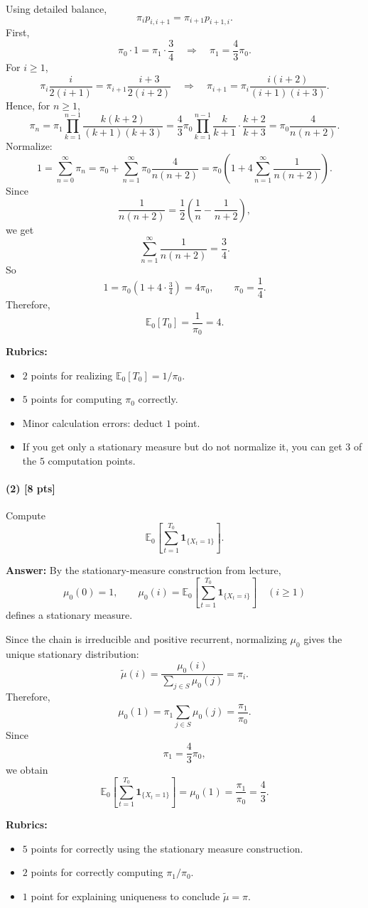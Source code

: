 \documentclass[11pt]{article}
\theoremstyle{definition}
\begin{document}
Using detailed balance,
\[
\pi_i p_{i,i+1}=\pi_{i+1}p_{i+1,i}.
\]
First,
\[
\pi_0\cdot 1=\pi_1\cdot \frac34
\quad \Rightarrow \quad
\pi_1=\frac43\pi_0.
\]
For \(i\ge 1\),
\[
\pi_i\frac{i}{2(i+1)}
=
\pi_{i+1}\frac{i+3}{2(i+2)}
\quad \Rightarrow \quad
\pi_{i+1}
=
\pi_i\frac{i(i+2)}{(i+1)(i+3)}.
\]
Hence, for \(n\ge 1\),
\[
\pi_n
=
\pi_1\prod_{k=1}^{n-1}\frac{k(k+2)}{(k+1)(k+3)}
=
\frac43\pi_0
\prod_{k=1}^{n-1}\frac{k}{k+1}\cdot\frac{k+2}{k+3}
=
\pi_0\frac{4}{n(n+2)}.
\]
Normalize:
\[
1
=
\sum_{n=0}^\infty \pi_n
=
\pi_0+\sum_{n=1}^\infty \pi_0\frac{4}{n(n+2)}
=
\pi_0\left(1+4\sum_{n=1}^\infty \frac{1}{n(n+2)}\right).
\]
Since
\[
\frac{1}{n(n+2)}=\frac12\left(\frac1n-\frac{1}{n+2}\right),
\]
we get
\[
\sum_{n=1}^\infty \frac{1}{n(n+2)}=\frac34.
\]
So
\[
1=\pi_0(1+4\cdot \tfrac34)=4\pi_0,
\qquad
\pi_0=\frac14.
\]
Therefore,
\[
\mathbb E_0[T_0]=\frac{1}{\pi_0}=4.
\]

\textbf{Rubrics:}
\begin{itemize}[leftmargin=2em]
    \item \(2\) points for realizing \(\mathbb E_0[T_0]=1/\pi_0\).
    \item \(5\) points for computing \(\pi_0\) correctly.
    \item Minor calculation errors: deduct \(1\) point.
    \item If you get only a stationary measure but do not normalize it, you can get \(3\) of the \(5\) computation points.
\end{itemize}

\paragraph{(2) \hfill [8 pts]}
Compute
\[
\mathbb E_0\left[\sum_{t=1}^{T_0}\mathbf 1_{\{X_t=1\}}\right].
\]

\textbf{Answer:}
By the stationary-measure construction from lecture,
\[
\mu_0(0)=1,
\qquad
\mu_0(i)=
\mathbb E_0\left[\sum_{t=1}^{T_0}\mathbf 1_{\{X_t=i\}}\right]
\quad (i\ge 1)
\]
defines a stationary measure.

Since the chain is irreducible and positive recurrent, normalizing \(\mu_0\) gives the unique stationary distribution:
\[
\tilde \mu(i)=\frac{\mu_0(i)}{\sum_{j\in S}\mu_0(j)}=\pi_i.
\]
Therefore,
\[
\mu_0(1)=\pi_1\sum_{j\in S}\mu_0(j)=\frac{\pi_1}{\pi_0}.
\]
Since
\[
\pi_1=\frac43\pi_0,
\]
we obtain
\[
\mathbb E_0\left[\sum_{t=1}^{T_0}\mathbf 1_{\{X_t=1\}}\right]
=
\mu_0(1)=\frac{\pi_1}{\pi_0}=\frac43.
\]

\textbf{Rubrics:}
\begin{itemize}[leftmargin=2em]
    \item \(5\) points for correctly using the stationary measure construction.
    \item \(2\) points for correctly computing \(\pi_1/\pi_0\).
    \item \(1\) point for explaining uniqueness to conclude \(\tilde\mu=\pi\).
\end{itemize}
\end{document}
